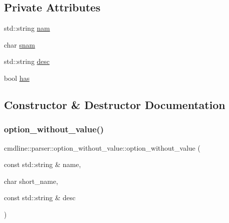 \subsection*{Private Attributes}
\begin{DoxyCompactItemize}
\item 
std\+::string \mbox{\hyperlink{classcmdline_1_1parser_1_1option__without__value_a98a6a5be850373dd91562996916486f1}{nam}}
\item 
char \mbox{\hyperlink{classcmdline_1_1parser_1_1option__without__value_a1827b8166d6d02fd052e8823ffe1a08d}{snam}}
\item 
std\+::string \mbox{\hyperlink{classcmdline_1_1parser_1_1option__without__value_aef631becaab8312bd32051815f63275b}{desc}}
\item 
bool \mbox{\hyperlink{classcmdline_1_1parser_1_1option__without__value_aedd977f6d5a8b7bf092128a12682f6f6}{has}}
\end{DoxyCompactItemize}


\subsection{Constructor \& Destructor Documentation}
\mbox{\label{classcmdline_1_1parser_1_1option__without__value_a3a750fc5d29bd692fdefd6f41b5ce341}} 
\subsubsection{\texorpdfstring{option\_without\_value()}{option\_without\_value()}}
{\footnotesize\ttfamily cmdline\+::parser\+::option\+\_\+without\+\_\+value\+::option\+\_\+without\+\_\+value (\begin{DoxyParamCaption}\item[{const std\+::string \&}]{name,  }\item[{char}]{short\+\_\+name,  }\item[{const std\+::string \&}]{desc }\end{DoxyParamCaption})\hspace{0.3cm}{\ttfamily [inline]}}

\mbox{\label{classcmdline_1_1parser_1_1option__without__value_a61b419f94d8f49212eea2c86bb2520e7}} 
